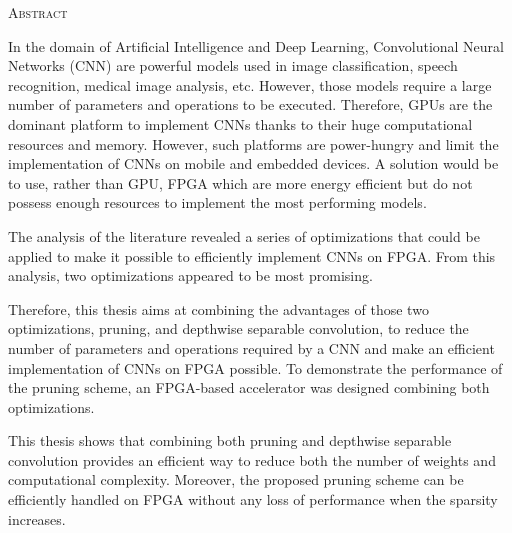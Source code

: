 \vspace*{\fill}

    \begin{center}
    \huge{\textsc{Abstract}}
    \end{center}
    
    In the domain of Artificial Intelligence and Deep Learning, Convolutional Neural Networks (CNN) are powerful models used in image classification, speech recognition, medical image analysis, etc. However, those models require a large number of parameters and operations to be executed. Therefore, GPUs are the dominant platform to implement CNNs thanks to their huge computational resources and memory. However, such platforms are power-hungry and limit the implementation of CNNs on mobile and embedded devices. A solution would be to use, rather than GPU, FPGA which are more energy efficient but do not possess enough resources to implement the most performing models. 
    
    The analysis of the literature revealed a series of optimizations that could be applied to make it possible to efficiently implement CNNs on FPGA. From this analysis, two optimizations appeared to be most promising.

    Therefore, this thesis aims at combining the advantages of those two optimizations, pruning, and depthwise separable convolution, to reduce the number of parameters and operations required by a CNN and make an efficient implementation of CNNs on FPGA possible. To demonstrate the performance of the pruning scheme, an FPGA-based accelerator was designed combining both optimizations.
    

    This thesis shows that combining both pruning and depthwise separable convolution provides an efficient way to reduce both the number of weights and computational complexity. Moreover, the proposed pruning scheme can be efficiently handled on FPGA without any loss of performance when the sparsity increases.

\vspace*{\fill}
\afterpage{\blankpage}
\newpage
